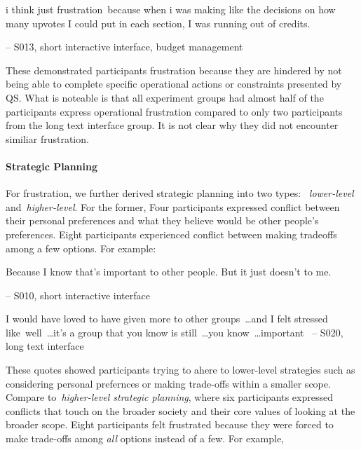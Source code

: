\begin{displayquote}
i think just frustration~\bracketellipsis because when i was making like the decisions on how many upvotes I could put in each section, I was running out of credits.

\noindent \hfill -- S013, short interactive interface, budget management
\end{displayquote}

These demonstrated participants frustration because they are hindered by not being able to complete specific operational actions or constraints presented by QS. What is noteable is that all experiment groups had almost half of the participants express operational frustration compared to only two participants from the long text interface group. It is not clear why they did not encounter similiar frustration.

\paragraph{Strategic Planning} For frustration, we further derived strategic planning into two types: ~\textit{lower-level} and~\textit{higher-level}. For the former, Four participants expressed conflict between their personal preferences and what they believe would be other people's preferences. Eight participants experienced conflict between making tradeoffs among a few options. For example:

\begin{displayquote}
Because I know that's important to other people. But it just doesn't to me.
    
\noindent \hfill -- S010, short interactive interface
\end{displayquote}

\begin{displayquote}
I would have loved to have given more to other groups~\ldots and I felt stressed like~\bracketellipsis well~\ldots it's a group that you know is still~\ldots you know~\ldots important~\bracketellipsis
\noindent \hfill -- S020, long text interface
\end{displayquote}

These quotes showed participants trying to ahere to lower-level strategies such as considering personal prefernces or making trade-offs within a smaller scope. Compare to~\textit{higher-level strategic planning}, where six participants expressed conflicts that touch on the broader society and their core values of looking at the broader scope. Eight participants felt frustrated because they were forced to make trade-offs among \textit{all} options instead of a few. For example,

